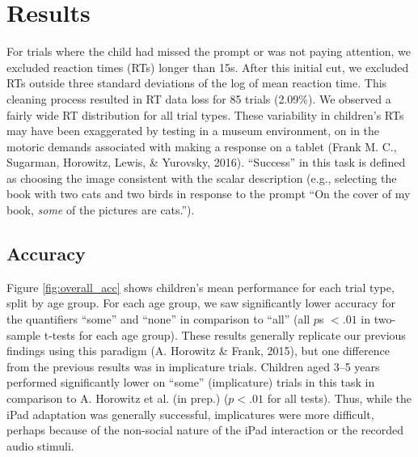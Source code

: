 \documentclass[10pt, letterpaper]{article}
\begin{document}
\section{Results}\label{results}

For trials where the child had missed the prompt or was not paying
attention, we excluded reaction times (RTs) longer than 15s. After this
initial cut, we excluded RTs outside three standard deviations of the
log of mean reaction time. This cleaning process resulted in RT data
loss for 85 trials (2.09\%). We observed a fairly wide RT distribution
for all trial types. These variability in children's RTs may have been
exaggerated by testing in a museum environment, on in the motoric
demands associated with making a response on a tablet (Frank M. C.,
Sugarman, Horowitz, Lewis, \& Yurovsky, 2016). ``Success'' in this task
is defined as choosing the image consistent with the scalar description
(e.g., selecting the book with two cats and two birds in response to the
prompt ``On the cover of my book, \emph{some} of the pictures are
cats.'').

\subsection{Accuracy}\label{accuracy}

Figure \ref{fig:overall_acc} shows children's mean performance for each
trial type, split by age group. For each age group, we saw significantly
lower accuracy for the quantifiers ``some'' and ``none'' in comparison
to ``all'' (all \(p\)s \(< .01\) in two-sample t-tests for each age
group). These results generally replicate our previous findings using
this paradigm (A. Horowitz \& Frank, 2015), but one difference from the
previous results was in implicature trials. Children aged 3--5 years
performed significantly lower on ``some'' (implicature) trials in this
task in comparison to A. Horowitz et al. (in prep.) (\(p < .01\) for all
tests). Thus, while the iPad adaptation was generally successful,
implicatures were more difficult, perhaps because of the non-social
nature of the iPad interaction or the recorded audio stimuli.
\end{document}

